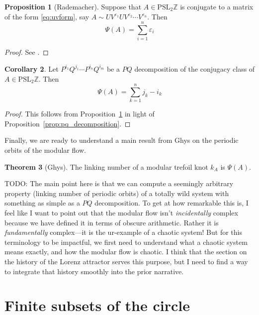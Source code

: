 \documentclass[12pt,twoside]{reedthesis}
\theoremstyle{definition}
\newtheorem{thm}{Theorem}[chapter]
\newtheorem{cor}[thm]{Corollary}
\newtheorem{prop}[thm]{Proposition}
\newcommand{\Z}{\mathbb{Z}}
\newcommand{\PSLZ}{\mathrm{PSL}_2{\Z}}
\newcommand{\TODO}[1]{{\color{todopink}\textsf{TODO: #1}}}
\begin{document}
\begin{prop}[Rademacher]\label{prop:rademacher_class_sum}
  Suppose that $A \in \PSLZ$ is conjugate to a matrix of the form \eqref{eq:uvform}, say $A \sim U V^{\varepsilon_1} U V^{\varepsilon_2} \cdots V^{\varepsilon_{n}}$.
  Then
  \begin{equation*}
    \Psi(A) = \sum_{i=1}^n \varepsilon_i
  \end{equation*}
\end{prop}

\begin{proof}
  See \cite[58-60]{rademacher1972}.
\end{proof}

\begin{cor}
  Let $P^{i_1} Q^{j_1} \cdots P^{i_n} Q^{i_m}$ be a $PQ$ decomposition of the conjugacy class of $A \in \PSLZ$.
  Then
  \begin{equation*}
    \Psi(A) = \sum_{k=1}^n j_k - i_k
  \end{equation*}
\end{cor}

\begin{proof}
  This follows from Proposition~\ref{prop:rademacher_class_sum} in light of Proposition~\ref{prop:pq_decomposition}.
\end{proof}

Finally, we are ready to understand a main result from Ghys on the periodic orbits of the modular flow.

\begin{thm}[Ghys]
  The linking number of a modular trefoil knot $k_A$ is $\Psi(A)$.
\end{thm}

\TODO{The main point here is that we can compute a seemingly arbitrary property (linking number of periodic orbits) of a totally wild system with something as simple as a $PQ$ decomposition. To get at how remarkable this is, I feel like I want to point out that the modular flow isn't \emph{incidentally} complex because we have defined it in terms of obscure arithmetic. Rather it is \emph{fundamentally} complex---it is the ur-example of a chaotic system! But for this terminology to be impactful, we first need to understand what a chaotic system means exactly, and how the modular flow is chaotic. I think that the section on the history of the Lorenz attractor serves this purpose, but I need to find a way to integrate that history smoothly into the prior narrative.}

\chapter{Finite subsets of the circle}\label{sec:finite_subsets}
\end{document}
